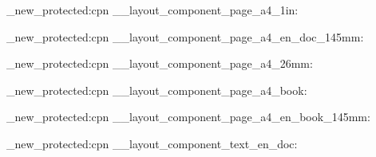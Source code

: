 \newcommand{\NextLayoutHeadFancyChapter}{\UseFeature{headers}}

\newcommand{\NextLayoutBookOpenRight}{}

\newcommand{\NextLayoutBookBlankPageEmpty}{
  \renewcommand{\cleardoublepage}{
    \clearpage
    \if@twoside
      \ifodd\c@page
      \else
        \hbox{}
        \thispagestyle{empty}
        \newpage
        \if@twocolumn
          \hbox{}
          \newpage
        \fi
      \fi
    \fi
  }
}

\newdimen\NextLayoutTocLabelWidth
\newcommand{\NextLayoutTocNumberline}[1]{%
  \settowidth{\NextLayoutTocLabelWidth}{#1\hspace{0.8em}}%
  \ifdim\NextLayoutTocLabelWidth<\@tempdima
    \NextLayoutTocLabelWidth=\@tempdima
  \fi
  \hb@xt@\NextLayoutTocLabelWidth{#1\hfil}%
}
\newcommand{\NextLayoutDynamicTocLabelSpacing}{%
  \let\numberline\NextLayoutTocNumberline
}

\makeatother

\cs_new_protected:cpn { __layout_component_page_a4_1in: }
  { \NextLayoutPageOneIn }

\cs_new_protected:cpn { __layout_component_page_a4_en_doc_145mm: }
  {
    \if@twoside
    \else
    \fi
  }

\cs_new_protected:cpn { __layout_component_page_a4_26mm: }
  { \NextLayoutPageTwentySixMm }

\cs_new_protected:cpn { __layout_component_page_a4_book: }
  {
  }

\cs_new_protected:cpn { __layout_component_page_a4_en_book_145mm: }
  {
  }

\cs_new_protected:cpn { __layout_component_text_en_doc: }
  {
    \NextLayoutDynamicTocLabelSpacing
    \RequirePackage{setspace}
    \setlength{\parindent}{15pt}
    \setlength{\parskip}{0.25em}
  }

